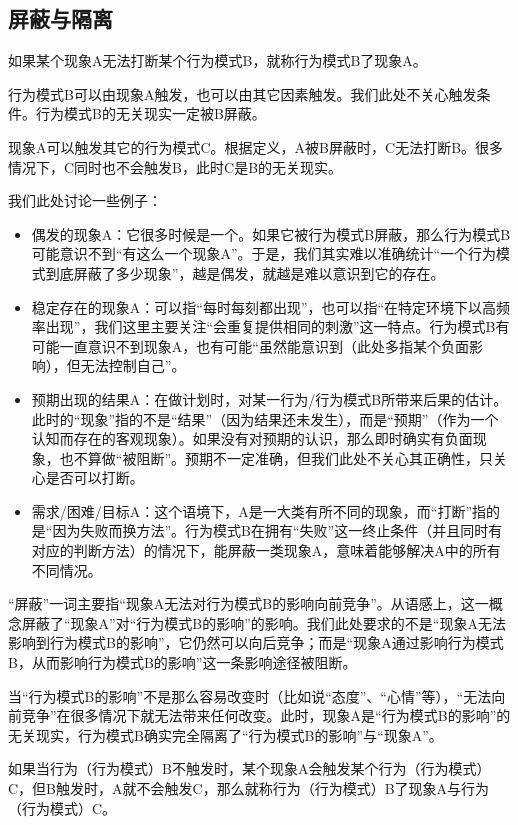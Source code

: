 \subsection{屏蔽与隔离}
\noindent 如果某个现象A无法打断某个行为模式B，就称行为模式B了现象A。
\begin{explain}
行为模式B可以由现象A触发，也可以由其它因素触发。我们此处不关心触发条件。行为模式B的无关现实一定被B屏蔽。

现象A可以触发其它的行为模式C。根据定义，A被B屏蔽时，C无法打断B。很多情况下，C同时也不会触发B，此时C是B的无关现实。

我们此处讨论一些例子：
\begin{itemize}
\item 偶发的现象A：它很多时候是一个。如果它被行为模式B屏蔽，那么行为模式B可能意识不到“有这么一个现象A”。于是，我们其实难以准确统计“一个行为模式到底屏蔽了多少现象”，越是偶发，就越是难以意识到它的存在。

\item 稳定存在的现象A：可以指“每时每刻都出现”，也可以指“在特定环境下以高频率出现”，我们这里主要关注“会重复提供相同的刺激”这一特点。行为模式B有可能一直意识不到现象A，也有可能“虽然能意识到（此处多指某个负面影响），但无法控制自己”。

\item 预期出现的结果A：在做计划时，对某一行为/行为模式B所带来后果的估计。此时的“现象”指的不是“结果”（因为结果还未发生），而是“预期”（作为一个认知而存在的客观现象）。如果没有对预期的认识，那么即时确实有负面现象，也不算做“被阻断”。预期不一定准确，但我们此处不关心其正确性，只关心是否可以打断。

\item 需求/困难/目标A：这个语境下，A是一大类有所不同的现象，而“打断”指的是“因为失败而换方法”。行为模式B在拥有“失败”这一终止条件（并且同时有对应的判断方法）的情况下，能屏蔽一类现象A，意味着能够解决A中的所有不同情况。
\end{itemize}
“屏蔽”一词主要指“现象A无法对行为模式B的影响向前竞争”。从语感上，这一概念屏蔽了“现象A”对“行为模式B的影响”的影响。我们此处要求的不是“现象A无法影响到行为模式B的影响”，它仍然可以向后竞争；而是“现象A通过影响行为模式B，从而影响行为模式B的影响”这一条影响途径被阻断。

当“行为模式B的影响”不是那么容易改变时（比如说“态度”、“心情”等），“无法向前竞争”在很多情况下就无法带来任何改变。此时，现象A是“行为模式B的影响”的无关现实，行为模式B确实完全隔离了“行为模式B的影响”与“现象A”。
\end{explain}
如果当行为（行为模式）B不触发时，某个现象A会触发某个行为（行为模式）C，但B触发时，A就不会触发C，那么就称行为（行为模式）B了现象A与行为（行为模式）C。
